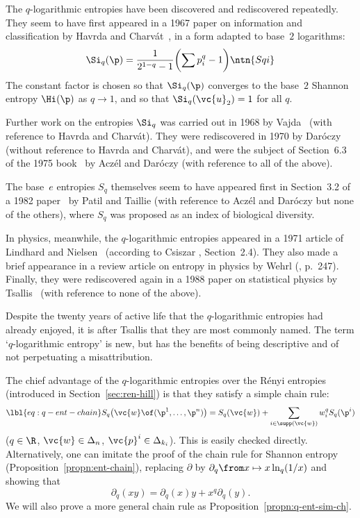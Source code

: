 \begin{remark}
%
The $q$-logarithmic entropies have been discovered and rediscovered
repeatedly.  They seem to have first appeared in a 1967 paper on
information and classification by Havrda%
%
%
and Charv\'at~\cite{HaCh},%
%
%
in a form adapted to base~$2$ logarithms:
\[
\Si_q(\p)
=
\frac{1}{2^{1 - q} - 1} \biggl( \sum p_i^q - 1 \biggr)
\ntn{Sqi}
\]
The constant factor is chosen so that $\Si_q(\p)$ converges to the base~$2$
Shannon entropy $\Hi(\p)$ as $q \to 1$, and so that $\Si_q(\vc{u}_2) = 1$
for all $q$.

Further work on the entropies $\Si_q$ was carried out in 1968 by
Vajda~\cite{Vajd} (with reference to Havrda and Charv\'at).  They were
rediscovered in 1970 by Dar\'oczy~\cite{DaroGIF} (without reference to
Havrda and Charv\'at), and were the subject of Section~6.3 of the 1975
book~\cite{AcDa} by Acz\'el and Dar\'oczy (with reference to all of the
above).

The base~$e$ entropies $S_q$ themselves seem to have appeared first in
Section~3.2 of a 1982 paper~\cite{PaTaDCM} by Patil%
%
%  
and Taillie%
%
% 
(with reference to Acz\'el and Dar\'oczy but none of the others), where
$S_q$ was proposed as an index of biological diversity.

In physics, meanwhile, the $q$-logarithmic entropies appeared in a 1971
article of Lindhard and Nielsen~\cite{LiNi} (according to Csiszar
\cite{Csis}, Section~2.4).  They also made a brief appearance in a review
article on entropy in physics by Wehrl (\cite{Wehr}, p.~247).  Finally,
they were rediscovered again in a 1988 paper on statistical physics by
Tsallis~\cite{TsalPGB}%
%
% 
(with reference to none of the above).

Despite the twenty years of active life that the $q$-logarithmic entropies
had already enjoyed, it is after Tsallis that they are most commonly named.
The term `$q$-logarithmic entropy' is new, but has the benefits of being
descriptive and of not perpetuating a misattribution.
\end{remark}
\pagebreak

The chief advantage of the $q$-logarithmic entropies over the R\'enyi
entropies (introduced in Section~\ref{sec:ren-hill}) is that
they satisfy a simple chain rule:%
% 
% 
\begin{equation}
\lbl{eq:q-ent-chain}
S_q\bigl(\vc{w} \of (\p^1, \ldots, \p^n)\bigr)
=
S_q(\vc{w}) + \sum_{i \in \supp(\vc{w})} w_i^q S_q(\p^i)
\end{equation}
% 
($q \in \R$, $\vc{w} \in \Delta_n$, $\vc{p}^i \in \Delta_{k_i}$).  This is
easily checked directly.  Alternatively, one can imitate the proof of the
chain rule for Shannon entropy (Proposition~\ref{propn:ent-chain}), replacing
$\partial$ by $\partial_q \from x \mapsto x \ln_q(1/x)$ and showing that
\[
\partial_q(xy) = \partial_q(x)y + x^q \partial_q(y).
\]
We will also prove a more general chain rule as
Proposition~\ref{propn:q-ent-sim-ch}.

